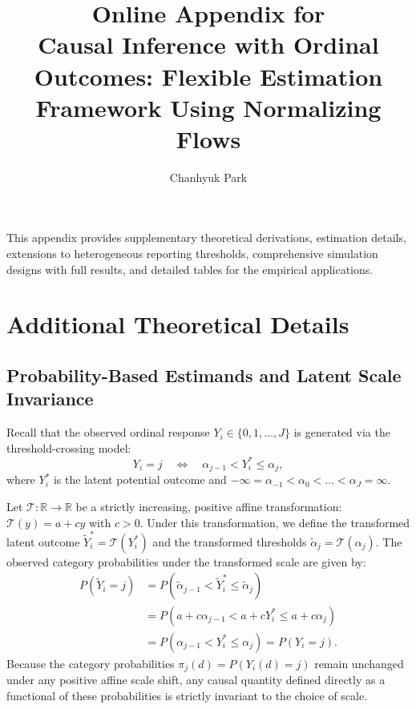 \documentclass{article}
\title{Online Appendix for \\ \vspace{0.5em} {Causal Inference with Ordinal Outcomes: Flexible Estimation Framework Using Normalizing Flows}}
\author{Chanhyuk Park}
\date{}
\numberwithin{figure}{section}
\numberwithin{table}{section}
\numberwithin{equation}{section}
\begin{document}
\maketitle

This appendix provides supplementary theoretical derivations, estimation details, extensions to heterogeneous reporting thresholds, comprehensive simulation designs with full results, and detailed tables for the empirical applications.

\tableofcontents
\clearpage

\section{Additional Theoretical Details}
\label{app:theory}

\subsection{Probability-Based Estimands and Latent Scale Invariance}
\label{appsub:invariance}

Recall that the observed ordinal response $Y_i \in \{0, 1, \dots, J\}$ is generated via the threshold-crossing model:
\begin{equation}
Y_i = j \quad \Longleftrightarrow \quad \alpha_{j-1} < Y_i^* \le \alpha_j,
\end{equation}
where $Y_i^*$ is the latent potential outcome and $-\infty = \alpha_{-1} < \alpha_0 < \dots < \alpha_J = \infty$. 

Let $\mathcal{T}: \mathbb{R} \to \mathbb{R}$ be a strictly increasing, positive affine transformation: $\mathcal{T}(y) = a + cy$ with $c > 0$. Under this transformation, we define the transformed latent outcome $\tilde{Y}_i^* = \mathcal{T}(Y_i^*)$ and the transformed thresholds $\tilde{\alpha}_j = \mathcal{T}(\alpha_j)$. The observed category probabilities under the transformed scale are given by:
\begin{align*}
P(\tilde{Y}_i = j) &= P(\tilde{\alpha}_{j-1} < \tilde{Y}_i^* \le \tilde{\alpha}_j) \\
&= P(a + c\alpha_{j-1} < a + cY_i^* \le a + c\alpha_j) \\
&= P(\alpha_{j-1} < Y_i^* \le \alpha_j) = P(Y_i = j).
\end{align*}
Because the category probabilities $\pi_j(d) = P(Y_i(d) = j)$ remain unchanged under any positive affine scale shift, any causal quantity defined directly as a functional of these probabilities is strictly invariant to the choice of scale. 
\end{document}
